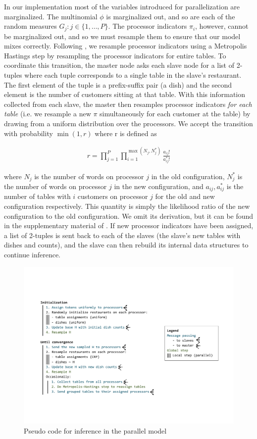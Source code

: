 In our implementation most of the variables introduced for
parallelization are marginalized. The multinomial $\phi$ is
marginalized out, and so are each of the random measures $G_j : j \in
\{1, \ldots, P\}$. The processor indicators $\pi_i$, however, cannot
be marginalized out, and so we must resample them to ensure that our
model mixes correctly. Following \cite{williamson2013}, we resample
processor indicators using a Metropolis Hastings step by resampling
the processor indicators for entire tables. To coordinate this
transition, the master node asks each slave node for a list of
2-tuples where each tuple corresponds to a single table in the slave's
restaurant. The first element of the tuple is a prefix-suffix pair (a
dish) and the second element is the number of customers sitting at
that table. With this information collected from each slave, the
master then resamples processor indicators \textit{for each table}
(i.e. we resample a new $\pi$ simultaneously for each customer at the
table) by drawing from a uniform distribution over the processors. We
accept the transition with probability $\min(1, r)$ where r is defined
as

\begin{align}
  r = \prod_{j = 1}^P \prod_{i=1}^{\max(N_j, N_j^*)} \frac{a_{ij}!}{a_{ij}^*!}
\end{align}

where $N_j$ is the number of words on processor $j$ in the old
configuration, $N_j^*$ is the number of words on processor $j$ in the
new configuration, and $a_{ij}, a_{ij}^*$ is the number of tables with
$i$ customers on processor $j$ for the old and new configuration
respectively. This quantity is simply the likelihood ratio of the new
configuration to the old configuration. We omit its derivation, but it
can be found in the supplementary material of
\cite{williamson2013}. If new processor indicators have been assigned,
a list of 2-tuples is sent back to each of the slaves (the slave's new
tables with dishes and counts), and the slave can then rebuild its
internal data structures to continue inference.

\begin{figure}[h]
  \centering
  \includegraphics[width=1.05\textwidth]{fig/parallel_code_schema}
  \caption{Pseudo code for inference in the parallel model}
  \label{fig:inference}
\end{figure}
